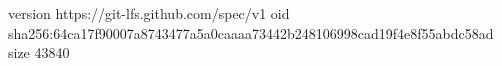 version https://git-lfs.github.com/spec/v1
oid sha256:64ca17f90007a8743477a5a0caaaa73442b248106998cad19f4e8f55abdc58ad
size 43840

